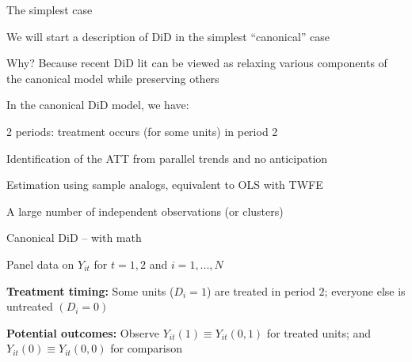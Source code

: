 \documentclass[aspectratio = 169, 12pt]{beamer}
\begin{document}
\begin{frame}{The simplest case}
  \begin{wideitemize}

    \item
    We will start a description of DiD in the simplest ``canonical'' case

    \item
    Why? Because recent DiD lit can be viewed as relaxing various components of the canonical model while preserving others
  \end{wideitemize}


  \pause
  In the canonical DiD model, we have:

  \medskip


  \begin{wideitemize}
    \item
    2 periods: treatment occurs (for some units) in period 2

    \item
    Identification of the ATT from parallel trends and no anticipation

    \item
    Estimation using sample analogs, equivalent to OLS with TWFE

    \item
    A large number of independent observations (or clusters)
  \end{wideitemize}
\end{frame}


\begin{frame}{Canonical DiD -- with math}
  \begin{wideitemize}
    \item
    Panel data on $Y_{it}$ for $t=1,2$ and $i = 1,...,N$

    \item
    \textbf{Treatment timing:} Some units ($D_i=1$) are treated in period $2$; everyone else is untreated $(D_i=0)$

    \pause
    \item
    \textbf{Potential outcomes:} Observe $Y_{it}(1) \equiv Y_{it}(0,1)$ for treated units; and $Y_{it}(0) \equiv Y_{it}(0,0)$ for comparison
  \end{wideitemize}
\end{frame}
\end{document}

